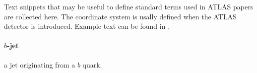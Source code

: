 Text snippets that may be useful to define standard terms used in ATLAS papers are collected here.
The coordinate system is usally defined when the ATLAS detector is introduced.
Example text can be found in .

\paragraph{$b$-jet} a jet originating from a $b$ quark.
